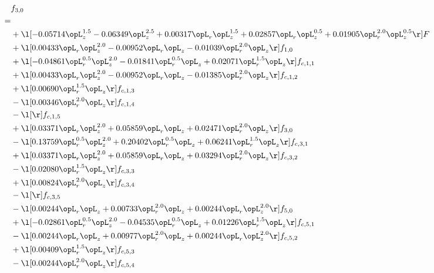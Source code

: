 \begin{alignat}{2} 
\label{eq:f_30_1} 
& f_{3,0} \nonumber \\ 
 = \\ 
& + \l[  -0.05714 \opL_z^{1.5}   -0.06349 \opL_z^{2.5} +  0.00317 \opL_r \opL_z^{1.5} +  0.02857 \opL_r \opL_z^{0.5} +  0.01905 \opL_r^{2.0} \opL_z^{0.5}  \r] F \nonumber \\ 
& + \l[  0.00433 \opL_r \opL_z^{2.0}   -0.00952 \opL_r \opL_z   -0.01039 \opL_r^{2.0} \opL_z  \r] f_{1,0} \nonumber \\ 
& + \l[  -0.04861 \opL_r^{0.5} \opL_z^{2.0}   -0.01841 \opL_r^{0.5} \opL_z +  0.02071 \opL_r^{1.5} \opL_z  \r] f_{c,1,1} \nonumber \\ 
& + \l[  0.00433 \opL_r \opL_z^{2.0}   -0.00952 \opL_r \opL_z   -0.01385 \opL_r^{2.0} \opL_z  \r] f_{c,1,2} \nonumber \\ 
& + \l[  0.00690 \opL_r^{1.5} \opL_z  \r] f_{c,1,3} \nonumber \\ 
& - \l[  0.00346 \opL_r^{2.0} \opL_z  \r] f_{c,1,4} \nonumber \\ 
& - \l[  \r] f_{c,1,5} \nonumber \\ 
& + \l[  0.03371 \opL_r \opL_z^{2.0} +  0.05859 \opL_r \opL_z +  0.02471 \opL_r^{2.0} \opL_z  \r] f_{3,0} \nonumber \\ 
& - \l[  0.13759 \opL_r^{0.5} \opL_z^{2.0} +  0.20402 \opL_r^{0.5} \opL_z +  0.06241 \opL_r^{1.5} \opL_z  \r] f_{c,3,1} \nonumber \\ 
& + \l[  0.03371 \opL_r \opL_z^{2.0} +  0.05859 \opL_r \opL_z +  0.03294 \opL_r^{2.0} \opL_z  \r] f_{c,3,2} \nonumber \\ 
& - \l[  0.02080 \opL_r^{1.5} \opL_z  \r] f_{c,3,3} \nonumber \\ 
& + \l[  0.00824 \opL_r^{2.0} \opL_z  \r] f_{c,3,4} \nonumber \\ 
& - \l[  \r] f_{c,3,5} \nonumber \\ 
& - \l[  0.00244 \opL_r \opL_z +  0.00733 \opL_r^{2.0} \opL_z +  0.00244 \opL_r \opL_z^{2.0}  \r] f_{5,0} \nonumber \\ 
& + \l[  -0.02861 \opL_r^{0.5} \opL_z^{2.0}   -0.04535 \opL_r^{0.5} \opL_z +  0.01226 \opL_r^{1.5} \opL_z  \r] f_{c,5,1} \nonumber \\ 
& - \l[  0.00244 \opL_r \opL_z +  0.00977 \opL_r^{2.0} \opL_z +  0.00244 \opL_r \opL_z^{2.0}  \r] f_{c,5,2} \nonumber \\ 
& + \l[  0.00409 \opL_r^{1.5} \opL_z  \r] f_{c,5,3} \nonumber \\ 
& - \l[  0.00244 \opL_r^{2.0} \opL_z  \r] f_{c,5,4} \nonumber \\ 

\end{alignat}
